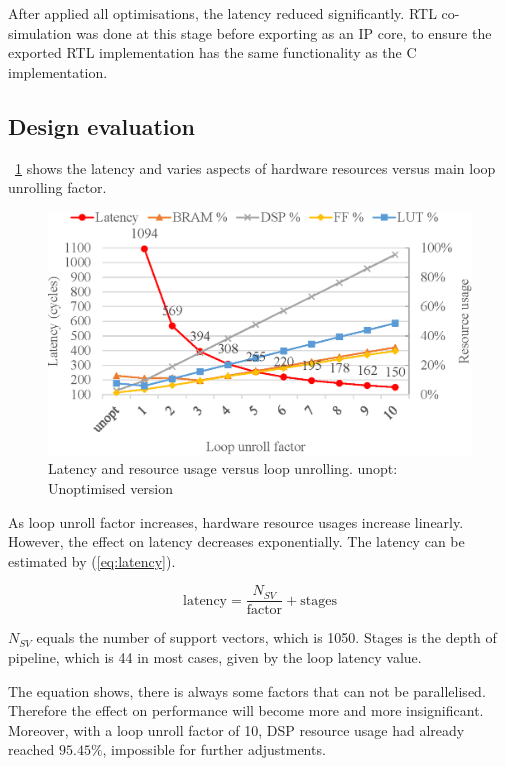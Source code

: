 \documentclass[journal]{IEEEtran}
\newcommand{\fref}[1]{\figurename~\ref{#1}}
\newcommand{\eref}[1]{(\ref{#1})}
\begin{document}
After applied all optimisations, the latency reduced significantly. RTL co-simulation was done at this stage before exporting as an IP core, to ensure the exported RTL implementation has the same functionality as the C implementation.

\subsection{Design evaluation}

\fref{fig:latency} shows the latency and varies aspects of hardware resources versus main loop unrolling factor.

\begin{figure}[ht]
	\centering
	\includegraphics[width=0.9\columnwidth]{latency}
	\caption{Latency and resource usage versus loop unrolling. unopt: Unoptimised version}
	\label{fig:latency}
\end{figure}

As loop unroll factor increases, hardware resource usages increase linearly. However, the effect on latency decreases exponentially. The latency can be estimated by \eref{eq:latency}.

\begin{equation}
	\text{latency} = \frac{N_{SV}}{\text{factor}} + \text{stages}
	\label{eq:latency}
\end{equation}

$N_{SV}$ equals the number of support vectors, which is 1050. Stages is the depth of pipeline, which is 44 in most cases, given by the loop latency value.

The equation shows, there is always some factors that can not be parallelised. Therefore the effect on performance will become more and more insignificant. Moreover, with a loop unroll factor of 10, DSP resource usage had already reached $95.45 \%$, impossible for further adjustments.
\end{document}
